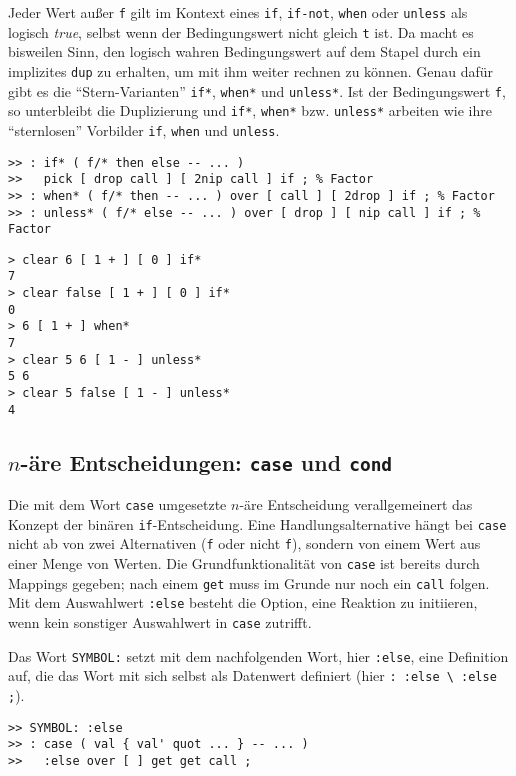 Jeder Wert außer \verb|f| gilt im Kontext eines \verb|if|, \verb|if-not|, \verb|when| oder \verb|unless| als logisch \emph{true}, selbst wenn der Bedingungswert nicht gleich \verb|t| ist. Da macht es bisweilen Sinn, den logisch wahren Bedingungswert auf dem Stapel durch ein implizites \verb|dup| zu erhalten, um mit ihm weiter rechnen zu können. Genau dafür gibt es die "`Stern-Varianten"' \verb|if*|, \verb|when*| und \verb|unless*|. Ist der Bedingungswert \verb|f|, so unterbleibt die Duplizierung und \verb|if*|, \verb|when*| bzw. \verb|unless*| arbeiten wie ihre "`sternlosen"' Vorbilder \verb|if|, \verb|when| und \verb|unless|.

\begin{verbatim}
>> : if* ( f/* then else -- ... )
>>   pick [ drop call ] [ 2nip call ] if ; % Factor
>> : when* ( f/* then -- ... ) over [ call ] [ 2drop ] if ; % Factor
>> : unless* ( f/* else -- ... ) over [ drop ] [ nip call ] if ; % Factor
\end{verbatim}

\begin{verbatim}
> clear 6 [ 1 + ] [ 0 ] if*
7
> clear false [ 1 + ] [ 0 ] if*
0
> 6 [ 1 + ] when*
7
> clear 5 6 [ 1 - ] unless*
5 6
> clear 5 false [ 1 - ] unless*
4
\end{verbatim}

\subsection{$n$-äre Entscheidungen: \texttt{case} und \texttt{cond}}

Die mit dem Wort \verb|case| umgesetzte $n$-äre Entscheidung verallgemeinert das Konzept der binären \verb|if|-Entscheidung. Eine Handlungsalternative hängt bei \verb|case| nicht ab von zwei Alternativen (\verb|f| oder nicht \verb|f|), sondern von einem Wert aus einer Menge von Werten. Die Grundfunktionalität von \verb|case| ist bereits durch Mappings gegeben; nach einem \verb|get| muss im Grunde nur noch ein \verb|call| folgen. Mit dem Auswahlwert \verb|:else| besteht die Option, eine Reaktion zu initiieren, wenn kein sonstiger Auswahlwert in \verb|case| zutrifft.

Das Wort \verb|SYMBOL:| setzt mit dem nachfolgenden Wort, hier \verb|:else|, eine Definition auf, die das Wort mit sich selbst als Datenwert definiert (hier \verb|: :else \ :else ;|).

\begin{verbatim}
>> SYMBOL: :else 
>> : case ( val { val' quot ... } -- ... )
>>   :else over [ ] get get call ;
\end{verbatim}

